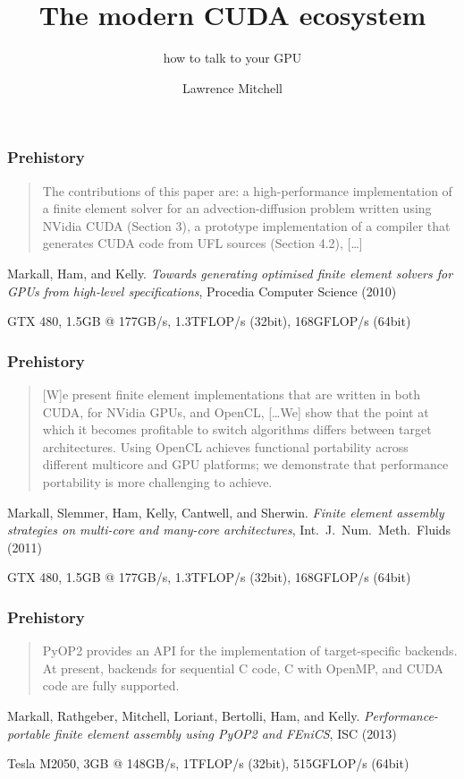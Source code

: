 \documentclass[aspectratio=169]{beamer}
\title{The modern CUDA ecosystem}
\subtitle{how to talk to your GPU}
\author{Lawrence Mitchell}
\institute{\texttt{lmitchell@nvidia.com}}
\begin{document}
\maketitle

\begin{frame}
  \frametitle{Prehistory}
  \begin{quote}
    The contributions of this paper are: a high-performance
    implementation of a finite element solver for an
    advection-diffusion problem written using NVidia CUDA (Section 3),
    a prototype implementation of a compiler that generates CUDA code
    from UFL sources (Section 4.2), [\dots]
  \end{quote}
  \pause
  {
    \scriptsize
    \raggedleft
    Markall, Ham, and Kelly.
    \emph{Towards generating optimised finite
      element solvers for GPUs from high-level specifications},
    Procedia Computer Science (2010)
    \par
    GTX 480, 1.5GB @ 177GB/s, 1.3TFLOP/s (32bit), 168GFLOP/s (64bit)
    \par
  }
\end{frame}
\begin{frame}
  \frametitle{Prehistory}
  \begin{quote}
    [W]e present finite element implementations that are
    written in both CUDA, for NVidia GPUs, and OpenCL, [\dots We] show
    that the point at which it becomes profitable to switch algorithms
    differs between target architectures. Using OpenCL achieves
    functional portability across different multicore and GPU
    platforms; we demonstrate that performance portability is more
    challenging to achieve.
  \end{quote}
  \pause
  {
    \scriptsize
    \raggedleft
    Markall, Slemmer, Ham, Kelly, Cantwell, and Sherwin.
    \emph{Finite element assembly strategies on multi-core and many-core architectures},
    Int.~J.~Num.~Meth.~Fluids (2011)
    \par
    \vspace{\baselineskip}
    GTX 480, 1.5GB @ 177GB/s, 1.3TFLOP/s (32bit), 168GFLOP/s (64bit)
    \par
  }
\end{frame}

\begin{frame}
  \frametitle{\textcolor{black!40}{Pre}history}
  \begin{quote}
    PyOP2 provides an API for the implementation of target-specific
    backends. At present, backends for sequential C code, C with
    OpenMP, and CUDA code are fully supported.
  \end{quote}
  \pause
  {
    \scriptsize
    \raggedleft
    Markall, Rathgeber, Mitchell, Loriant, Bertolli, Ham, and Kelly.
    \emph{Performance-portable finite element assembly using PyOP2 and FEniCS},
    ISC (2013)
    \par
    Tesla M2050, 3GB @ 148GB/s, 1TFLOP/s (32bit), 515GFLOP/s (64bit)
    \par
  }
\end{frame}
\end{document}
